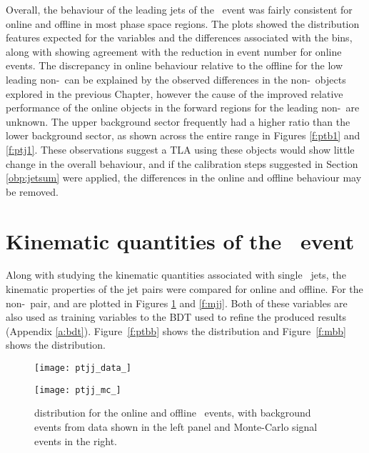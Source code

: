     Overall, the behaviour of the leading jets of the \VBFHBB\ event was fairly consistent for online and offline in most phase space regions. The plots showed the distribution features expected for the variables and the differences associated with the \mbb bins, along with showing agreement with the reduction in event number for online events. The discrepancy in online behaviour relative to the offline for the low \pt leading non-\bjets\ can be explained by the observed differences in the non-\bjet\ objects explored in the previous Chapter, however the cause of the improved relative performance of the online objects in the forward regions for the leading non-\bjet\ are unknown. The upper background sector frequently had a higher ratio than the lower background sector, as shown across the entire \pt range in Figures \ref{f:ptb1} and \ref{f:ptj1}. These observations suggest a TLA using these objects would show little change in the overall behaviour, and if the calibration steps suggested in Section \ref{obp:jetsum} were applied, the differences in the online and offline behaviour may be removed.


\section{Kinematic quantities of the \VBFHBB\ event}

	Along with studying the kinematic quantities associated with single \VBFHBB\ jets, the kinematic properties of the jet pairs were compared for online and offline. For the non-\bjet\ pair, \ptjj and \mjj are plotted in Figures \ref{f:ptjj} and \ref{f:mjj}. Both of these variables are also used as training variables to the BDT used to refine the produced results (Appendix \ref{a:bdt}). Figure~\ref{f:ptbb} shows the \ptbb distribution and Figure~\ref{f:mbb} shows the \mbb distribution.

        \begin{figure}[h]
            \centering
            \begin{minipage}[h]{0.48\linewidth}
                \texttt{[image: ptjj\_data\_]}
            \end{minipage}
            \quad
            \begin{minipage}[h]{0.48\linewidth}
                \texttt{[image: ptjj\_mc\_]}
            \end{minipage}
            \caption[Comparison of the \ptjj distribution of the \VBFHBB\ events for HLT and offline objects]{\ptjj distribution for the online and offline \VBFHBB\ events, with background events from data shown in the left panel and Monte-Carlo signal events in the right.}
        	\label{f:ptjj}
        \end{figure}

